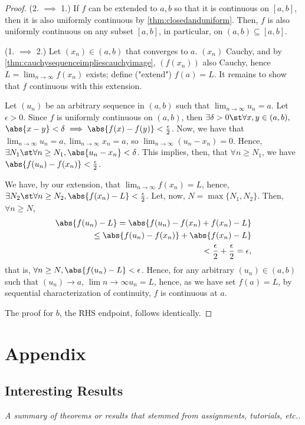 \documentclass[12pt]{article}
\begin{document}
\begin{proof}
  (2. $\implies$ 1.) If $f$ can be extended to $a,b$ so that it is continuous on $[a,b]$, then it is also uniformly continuous by \cref{thm:closedanduniform}. Then, $f$ is also uniformly continuous on any subset $[a,b]$, in particular, on $(a,b) \subseteq [a,b]$.

  \noindent (1. $\implies$ 2.) Let $(x_n) \in (a,b)$ that converges to $a$. $(x_n)$ Cauchy, and by \cref{thm:cauchysequenceimpliescauchyimage}, $(f(x_n))$ also Cauchy, hence $L = \lim_{n\to\infty} f(x_n)$ exists; define ("extend") $f(a) = L$. It remains to show that $f$ continuous with this extension.

  Let $(u_n)$ be an arbitrary sequence in $(a, b)$ such that $\lim_{n\to\infty} u_n = a$. Let $\epsilon > 0$. Since $f$ is uniformly continuous on $(a,b)$, then $\exists \delta > 0 \st \forall x, y \in (a, b),$ $\abs{x - y} < \delta \implies \abs{f(x) - f(y)} < \frac{\epsilon}{2}$. Now, we have that $\lim_{n\to\infty} u_n = a, \lim_{n\to\infty} x_n = a$, so $\lim_{n\to\infty} (u_n - x_n) = 0$. Hence, $\exists N_1 \st \forall n \geq N_1, \abs{u_n - x_n} < \delta$. This implies, then, that $\forall n \geq N_1$, we have $\abs{f(u_n) - f(x_n)} < \frac{\epsilon}{2}$.

  We have, by our extension, that $\lim_{n\to\infty} f(x_n) = L$, hence, $\exists N_2 \st \forall n \geq N_2, \abs{f(x_n) - L} < \frac{\epsilon}{2}$. Let, now, $N = \max \{N_1, N_2\}$. Then, $\forall n \geq N$, \begin{align*}
    \abs{f(u_n) - L} = \abs{f(u_n) - f(x_n) + f(x_n) - L}\\
    \leq \abs{f(u_n) - f(x_n)} + \abs{f(x_n) - L}\\
    < \frac{\epsilon}{2}  + \frac{\epsilon}{2} = \epsilon, 
  \end{align*}
  that is, $\forall n \geq N, \abs{f(u_n) - L} < \epsilon$. Hence, for any arbitrary $(u_n) \in (a,b)$ such that $(u_n) \to a$, $\lim{n\to \infty} u_n = L$, hence, as we have set $f(a) = L$, by sequential characterization of continuity, $f$ is continuous at $a$.

  The proof for $b$, the RHS endpoint, follows identically.
\end{proof}

\newpage
\section{Appendix}
\subsection{Interesting Results}
\textit{A summary of theorems or results that stemmed from assignments, tutorials, etc..}
\end{document}
